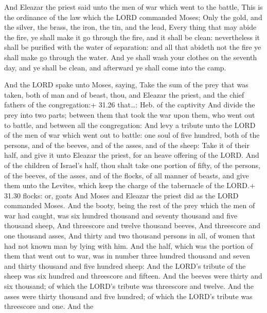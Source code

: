  And Eleazar the priest said unto the men of war which
went to the battle, This is the ordinance of the law which the LORD
commanded Moses;  Only the gold, and the silver, the brass,
the iron, the tin, and the lead,  Every thing that may
abide the fire, ye shall make it go through the fire, and it shall be
clean: nevertheless it shall be purified with the water of separation:
and all that abideth not the fire ye shall make go through the water.
 And ye shall wash your clothes on the seventh day, and ye
shall be clean, and afterward ye shall come into the camp.

 And the LORD spake unto Moses, saying, 
Take the sum of the prey that was taken, both of man and of beast, thou,
and Eleazar the priest, and the chief fathers of the congregation:+
31.26 that\ldots: Heb. of the captivity  And divide the
prey into two parts; between them that took the war upon them, who went
out to battle, and between all the congregation:  And levy
a tribute unto the LORD of the men of war which went out to battle: one
soul of five hundred, both of the persons, and of the beeves, and of the
asses, and of the sheep:  Take it of their half, and give
it unto Eleazar the priest, for an heave offering of the LORD.
 And of the children of Israel's half, thou shalt take one
portion of fifty, of the persons, of the beeves, of the asses, and of
the flocks, of all manner of beasts, and give them unto the Levites,
which keep the charge of the tabernacle of the LORD.+ 31.30 flocks: or,
goats  And Moses and Eleazar the priest did as the LORD
commanded Moses.  And the booty, being the rest of the prey
which the men of war had caught, was six hundred thousand and seventy
thousand and five thousand sheep,  And threescore and
twelve thousand beeves,  And threescore and one thousand
asses,  And thirty and two thousand persons in all, of
women that had not known man by lying with him.  And the
half, which was the portion of them that went out to war, was in number
three hundred thousand and seven and thirty thousand and five hundred
sheep:  And the LORD's tribute of the sheep was six hundred
and threescore and fifteen.  And the beeves were thirty and
six thousand; of which the LORD's tribute was threescore and twelve.
 And the asses were thirty thousand and five hundred; of
which the LORD's tribute was threescore and one.  And the

